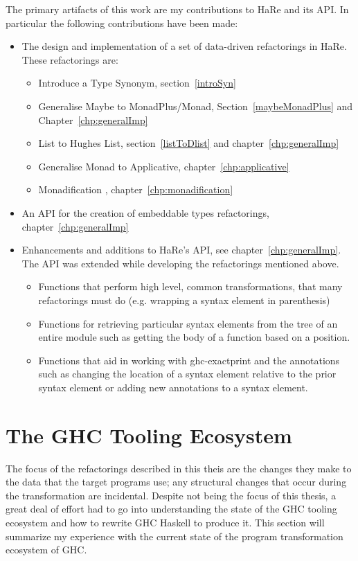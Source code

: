 The primary artifacts of this work are my contributions to HaRe and its API. In particular the following contributions have been made:

\begin{itemize}
\item The design and implementation of a set of data-driven refactorings in HaRe. These refactorings are:
	\begin{itemize}
		\item Introduce a Type Synonym, section~\ref{introSyn}
		\item Generalise Maybe to MonadPlus/Monad, Section~\ref{maybeMonadPlus} and Chapter~\ref{chp:generalImp}
		\item List to Hughes List, section~\ref{listToDlist} and chapter~\ref{chp:generalImp}
		\item Generalise Monad to Applicative, chapter~\ref{chp:applicative}
		\item Monadification	, chapter~\ref{chp:monadification}	
	\end{itemize}
\item An API for the creation of embeddable types refactorings, chapter~\ref{chp:generalImp}
\item Enhancements and additions to HaRe's API, see chapter~\ref{chp:generalImp}. The API was extended while developing the refactorings mentioned above.
\begin{itemize}
	\item Functions that perform high level, common transformations, that many refactorings must do (e.g. wrapping a syntax element in parenthesis)
	\item Functions for retrieving particular syntax elements from the tree of an entire module such as getting the body of a function based on a position.
	\item Functions that aid in working with ghc-exactprint and the annotations such as changing the location of a syntax element relative to the prior syntax element or adding new annotations to a syntax element.
\end{itemize}	  
\end{itemize}

\section{The GHC Tooling Ecosystem}

The focus of the refactorings described in this theis are the changes they make to the data that the target programs use; any structural changes that occur during the transformation are incidental. Despite not being the focus of this thesis, a great deal of effort had to go into understanding the state of the GHC tooling ecosystem and how to rewrite GHC Haskell to produce it. This section will summarize my experience with the current state of the program transformation ecosystem of GHC.

